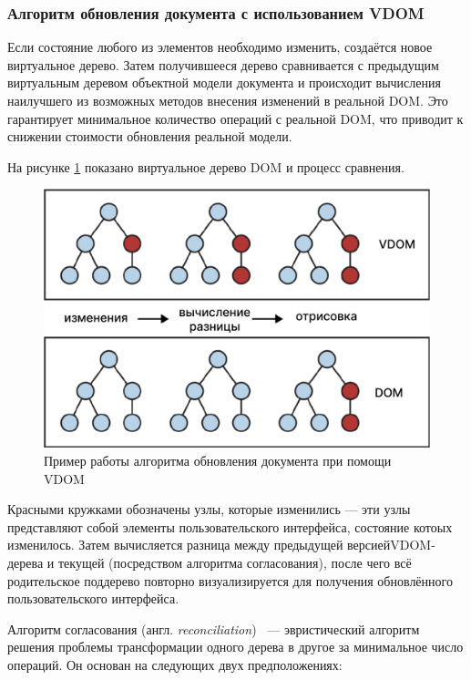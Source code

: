 \subsubsection{Алгоритм обновления документа с использованием VDOM}

Если состояние любого из элементов необходимо изменить, создаётся новое виртуальное дерево.
Затем получившееся дерево сравнивается с предыдущим виртуальным деревом объектной модели документа и происходит вычисления наилучшего из возможных методов внесения изменений в реальной DOM.
Это гарантирует минимальное количество операций с реальной DOM, что приводит к снижении стоимости обновления реальной модели.

На рисунке \ref{fig:vdom-example} показано виртуальное дерево DOM и процесс сравнения.

\begin{figure}[h]
	\centering
	\captionsetup{justification=centering}
	\includegraphics[width=130mm]{img/vdom-example.png}
	\caption{Пример работы алгоритма обновления документа при помощи VDOM}
	\label{fig:vdom-example}
\end{figure}

Красными кружками обозначены узлы, которые изменились --- эти узлы представляют собой элементы пользовательского интерфейса, состояние котоых изменилось.
Затем вычисляется разница между предыдущей версией\break VDOM-дерева и текущей (посредством алгоритма согласования), после чего всё родительское поддерево повторно визуализируется для получения обновлённого пользовательского интерфейса.


Алгоритм согласования (англ. \textit{reconciliation})~\cite{reconciliation} --- эвристический алгоритм решения проблемы трансформации одного дерева в другое за минимальное число операций.
Он основан на следующих двух предположениях:

